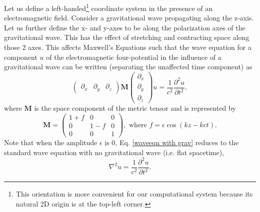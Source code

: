 \documentclass{article}
\begin{document}
Let us define a left-handed\footnote{This orientation is more convenient for our computational system because its natural 2D origin is at the top-left corner.} coordinate system in the presence of an electromagnetic field. Consider a gravitational wave propagating along the z-axis. Let us further define the x- and y-axes to be along the polarization axes of the gravitational wave. This has the effect of stretching and contracting space along those 2 axes. This affects Maxwell's Equations such that the wave equation for a component $u$ of the electromagnetic four-potential in the influence of a gravitational wave can be written (separating the unaffected time component) as
\begin{equation} \label{waveeqn with grav}
\begin{pmatrix}\partial_x & \partial_y & \partial_z\end{pmatrix} 
\textbf{M}
\begin{pmatrix} \partial_x \\ \partial_y \\ \partial_z \end{pmatrix}
u
=\frac{1}{c^2}\frac{\partial^2 u}{\partial t^2},
\end{equation}
where $\textbf{M}$ is the space component of the metric tensor and is represented by
\begin{equation} \label{M}
\textbf{M}=\begin{pmatrix}
1+f & 0 & 0 \\
0 & 1-f & 0 \\
0 & 0 & 1
\end{pmatrix},
\text{ \ \ \ where } f=\epsilon \cos(kz-kct).
\end{equation}
Note that when the amplitude $\epsilon$ is 0, Eq. \ref{waveeqn with grav} reduces to the standard wave equation with no gravitational wave (i.e. flat spacetime),
\begin{equation} \label{waveeqn flat}
\nabla^2u=\frac{1}{c^2}\frac{\partial^2u}{\partial t^2}.
\end{equation}
\end{document}
